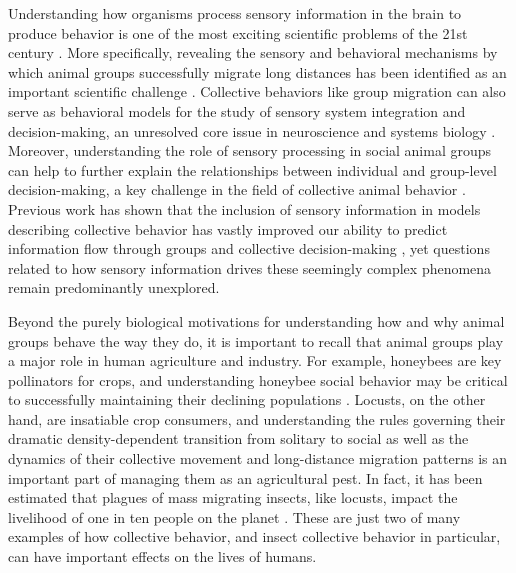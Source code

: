 \documentclass[11pt,a4paper,oneside]{book}
\begin{document}
	\par
	Understanding how organisms process sensory information in the brain to produce behavior is one of the most exciting scientific problems of the 21st century \citep{anderson2014competho}. More specifically, revealing the sensory and behavioral mechanisms by which animal groups successfully migrate long distances has been identified as an important scientific challenge \citep{kennedy2005don,miller2005biological}. Collective behaviors like group migration can also serve as behavioral models for the study of sensory system integration and decision-making, an unresolved core issue in neuroscience and systems biology \citep{gold2007neural}. Moreover, understanding the role of sensory processing in social animal groups can help to further explain the relationships between individual and group-level decision-making, a key challenge in the field of collective animal behavior \citep{croft2008exploring,couzin2007collective}. Previous work has shown that the inclusion of sensory information in models describing collective behavior has vastly improved our ability to predict information flow through groups and collective decision-making \citep{bazazi2008collective,strandburg2013visual,strandburg2017habitat,rosenthal2015network,twomey2016vision}, yet questions related to how sensory information drives these seemingly complex phenomena remain predominantly unexplored.
	\par
	Beyond the purely biological motivations for understanding how and why animal groups behave the way they do, it is important to recall that animal groups play a major role in human agriculture and industry. For example, honeybees are key pollinators for crops, and understanding honeybee social behavior may be critical to successfully maintaining their declining populations \citep{vanbergen2013threats}. Locusts, on the other hand, are insatiable crop consumers, and understanding the rules governing their dramatic density-dependent transition from solitary to social  \citep{simpson2001gregarious} as well as the dynamics of their collective movement \citep{buhl2006disorder} and long-distance migration patterns \citep{kennedy1951migration} is an important part of managing them as an agricultural pest. In fact, it has been estimated that plagues of mass migrating insects, like locusts, impact the livelihood of one in ten people on the planet \citep{kennedy1985migration}. These are just two of many examples of how collective behavior, and insect collective behavior in particular, can have important effects on the lives of humans. 
\end{document}
